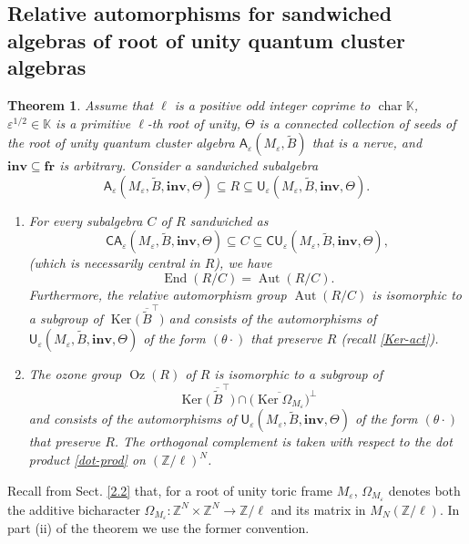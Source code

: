 \documentclass[11pt]{amsart}
\theoremstyle{plain}
\newtheorem{theorem}{Theorem}[section]
\newcommand \bth[1] { \begin{theorem}\label{t#1} }
\renewcommand {\eth} { \end{theorem} }
\def \KK {{\mathbb C}}
\def \KK {{\mathbb K}}
\def \Zset {{\mathbb Z}}
\def \A {{\boldsymbol{\mathsf A}}}
\def \C {{\boldsymbol{\mathsf C}}}
\def \U {{\boldsymbol{\mathsf U}}}
\def \B  {{\widetilde{B}}}
\newcommand \fr {{\mathbf{fr}}}
\newcommand \inv {{\mathbf{inv}}}
\def \Om {\Omega}
\def \ep {\varepsilon}
\def \ol {\overline}
\DeclareMathOperator \Aut { {\mathrm{Aut}} }
\DeclareMathOperator \Oz { {\mathrm{Oz}}}
\DeclareMathOperator \charr { {\mathrm{char}} }
\DeclareMathOperator \Ker { {\mathrm{Ker}} }
\DeclareMathOperator \End { {\mathrm{End}} }
\begin{document}
\subsection{Relative automorphisms for sandwiched algebras of root of unity quantum cluster algebras}
\bth{aut-qcl} Assume that $\ell$ is a positive odd integer coprime to $\charr \KK$, $\ep^{1/2} \in \KK$ is a primitive $\ell$-th root of unity, $\Theta$ is a connected collection of seeds of the root of unity quantum cluster algebra $\A_\ep(M_\ep, \B)$ that is a nerve, and $\inv \subseteq \fr$ is arbitrary. 
Consider a sandwiched subalgebra  
\[
\A_\ep(M_\ep, \B, \inv, \Theta) \subseteq R \subseteq \U_\ep(M_\ep, \B, \inv, \Theta).
\]
\begin{enumerate}
\item[(i)] For every subalgebra $C$ of $R$ sandwiched as 
\[
\C\A_\ep(M_\ep, \B, \inv, \Theta) \subseteq C \subseteq \C\U_\ep(M_\ep, \B, \inv, \Theta), 
\]
(which is necessarily central in $R$), we have
\begin{equation}
\label{EndAut}
\End(R/C) = \Aut(R/C).
\end{equation}
Furthermore, the relative automorphism group $\Aut(R/C)$ is isomorphic to a subgroup of $\Ker \big( \, \ol{\B}^\top \big)$ and consists of the automorphisms of $\U_\ep(M_\ep, \B, \inv, \Theta)$ of the form $(\theta \cdot)$ that preserve $R$ (recall \eqref{Ker-act}).
\item[(ii)] The ozone group $\Oz(R)$ of $R$ is isomorphic to a subgroup of 
\[
\Ker \big( \, \ol{\B}^\top \big) \cap \Big( 
\ol{\Ker \Om_{M_\ep}} \Big)^\perp
\]
and consists of the automorphisms of $\U_\ep(M_\ep, \B, \inv, \Theta)$ of the form $(\theta \cdot)$ that preserve $R$. The orthogonal complement is taken with respect to the dot product \eqref{dot-prod} on $(\Zset/\ell)^N$.
\end{enumerate}
\eth
Recall from Sect. \ref{2.2} that, for a root of unity toric frame $M_\ep$, $\Om_{M_\ep}$ denotes both the additive bicharacter $\Om_{M_\ep} : \Zset^N \times \Zset^N \to \Zset/\ell$ and its matrix in $M_N(\Zset/\ell)$. In part (ii) of the theorem we use the former convention.
\end{document}
